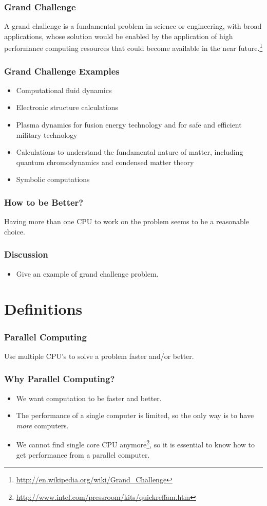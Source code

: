 \documentclass{beamer}
\begin{document}
\begin{CJK}{UTF8}{bsmi}
\begin{frame}
\frametitle{Grand Challenge} A grand challenge is a fundamental
problem in science or engineering, with broad applications, whose
solution would be enabled by the application of high performance
computing resources that could become available in the near
future.\footnote{\url{http://en.wikipedia.org/wiki/Grand_Challenge}}
\end{frame}

\begin{frame}
\frametitle{Grand Challenge Examples} 
\begin{itemize}
\item Computational fluid dynamics
\item Electronic structure calculations
\item Plasma dynamics for fusion energy technology and for safe and
  efficient military technology
\item Calculations to understand the fundamental nature of matter,
  including quantum chromodynamics and condensed matter theory
\item Symbolic computations
\end{itemize}
\end{frame}

\begin{frame}
\frametitle{How to be Better?}
\Huge Having more than one CPU to work on the problem seems to be a
  reasonable choice.
\end{frame}

\begin{frame}
\frametitle{Discussion} 
\begin{itemize}
\item Give an example of grand challenge problem.
\end{itemize}
\end{frame}


\section{Definitions}

\begin{frame}
\frametitle{Parallel Computing}  \Huge Use multiple CPU's to solve a
problem faster and/or better.
\end{frame}

\begin{frame}
\frametitle{Why Parallel Computing?}
\begin{itemize}
\item We want computation to be faster and better.
\item The performance of a single computer is limited, so the only way
  is to have {\em more} computers.
\item We cannot find single core CPU
  anymore\footnote{\url{http://www.intel.com/pressroom/kits/quickreffam.htm}},
  so it is essential to know how to get performance from a parallel
  computer.
\end{itemize}
\end{frame}


\end{CJK}
\end{document}

